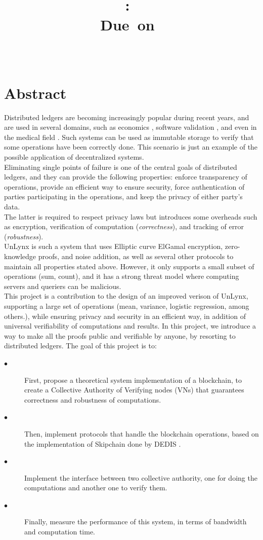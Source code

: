 \documentclass{article}
\title{
\logoepfl
\vspace{2in}
\textmd{\textbf{\hmwkClass:\ \hmwkTitle}}\\
\normalsize\vspace{0.1in}\small{Due\ on\ \hmwkDueDate}\\
\vspace{0.1in}\large{\textit{\hmwkClassInstructor\ \hmwkClassTime}}
\author{\textbf{\hmwkAuthorName}}
\vspace{3in}
}
\begin{document}
\maketitle

\newpage
\section*{Abstract}
Distributed ledgers are becoming increasingly popular during recent years, and are used in several domains, such as economics \cite{bitcoin}, software validation \cite{chainiac}, and even in the medical field \cite{health}. Such systems can be used as immutable storage to verify that some operations have been correctly done. This scenario is just an example of the possible application of decentralized systems.\\
Eliminating single points of failure is one of the central goals of distributed ledgers,  and they can provide the following properties: enforce transparency of operations, provide an efficient way to ensure security, force authentication of parties participating in the operations, and keep the privacy of either party's data.\\
The latter is required to respect privacy laws but introduces some overheads such as encryption, verification of computation (\textit{correctness}), and tracking of error (\textit{robustness}).\\
UnLynx \cite{unlynx} is such a system that uses Elliptic curve ElGamal encryption, zero-knowledge proofs, and noise addition, as well as several other protocols to maintain all properties stated above. However, it only supports a small subset of operations (sum, count), and it has a strong threat model where computing servers and queriers can be malicious.\\
This project is a contribution to the design of an improved verison of UnLynx, supporting a large set of operations (mean, variance, logistic regression, among others.), while ensuring privacy and security in an efficient way, in addition of universal verifiability of computations and results.
In this project, we introduce a way to make all the proofs public and verifiable by anyone, by resorting to distributed ledgers.
The goal of this project is to:
\begin{description}
\item[$\bullet$] First, propose a theoretical system implementation of a blockchain, to create a Collective Authority of Verifying nodes (VNs) that guarantees correctness and robustness of computations.
\item[$\bullet$] Then, implement protocols that handle the blockchain operations, based on the implementation of Skipchain done by DEDIS \cite{dedis}.
\item[$\bullet$] Implement the interface between two collective authority, one for doing the computations and another one to verify them.
\item[$\bullet$] Finally, measure the performance of this system, in terms of bandwidth and computation time.
\end{description}
\end{document}
